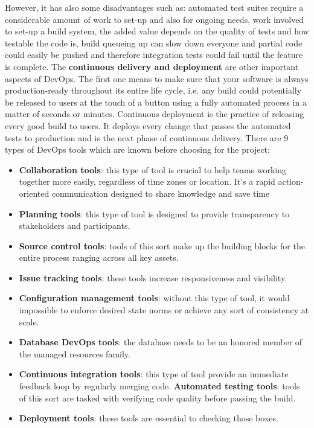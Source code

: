 However, it has also some disadvantages such as: automated test suites require a considerable amount of work to set-up and also for ongoing needs, work involved to set-up a build system, the added value depends on the quality of tests and how testable the code is, build queueing up can slow down everyone and partial code could easily be pushed and therefore integration tests could fail until the feature is complete.
The \textbf{continuous delivery and deployment} are other important aspects of DevOps.
The first one means to make sure that your software is always production-ready throughout its entire life cycle, i.e. any build could potentially be released to users at the touch of a button using a fully automated process in a matter of seconds or minutes.
Continuous deployment is the practice of releasing every good build to users.
It deploys every change that passes the automated tests to production and is the next phase of continuous delivery.
\newline\newline
There are $9$ types of DevOps tools which are known before choosing for the project:
\begin{itemize}
    \item \textbf{Collaboration tools}: this type of tool is crucial to help teams working together more easily, regardless of time zones or location. It's a rapid action-oriented communication designed to share knowledge and save time
    \item \textbf{Planning tools}: this type of tool is designed to provide transparency to stakeholders and participants.
    \item \textbf{Source control tools}: tools of this sort make up the building blocks for the entire process ranging across all key assets.
    \item \textbf{Issue tracking tools}: these tools increase responsiveness and visibility.
    \item \textbf{Configuration management tools}: without this type of tool, it would impossible to enforce desired state norms or achieve any sort of consistency at scale.
    \item \textbf{Database DevOps tools}: the database needs to be an honored member of the managed resources family.
    \item \textbf{Continuous integration tools}: this type of tool provide an immediate feedback loop by regularly merging code.
          \textbf{Automated testing tools}:  tools of this sort are tasked with verifying code quality before passing the build.
    \item \textbf{Deployment tools}: these tools are essential to checking those boxes.
\end{itemize}